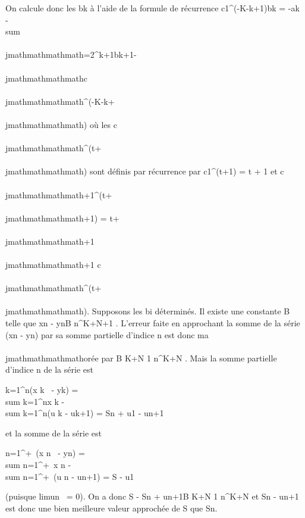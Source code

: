On calcule donc les bk à l'aide de la formule de récurrence
c1^(-K-k+1)bk = -ak
-\\sum ~
\\\\jmathmathmathmath=2^k+1bk+1-\\\\jmathmathmathmathc\\\\jmathmathmathmath^(-K-k+\\\\jmathmathmathmath) où
les c\\\\jmathmathmathmath^(t+\\\\jmathmathmathmath) sont définis par récurrence par
c1^(t+1) = t + 1 et c\\\\jmathmathmathmath+1^(t+\\\\jmathmathmathmath+1) =
t+\\\\jmathmathmathmath+1 \over \\\\jmathmathmathmath+1 c\\\\jmathmathmathmath^(t+\\\\jmathmathmathmath). Supposons
les bi déterminés. Il existe une constante B telle que
\textbar{}xn - yn\textbar{}\leq B
\over n^K+N+1 . L'erreur faite en approchant
la somme de la série \\\sum
 (xn - yn) par sa somme partielle d'indice n est
donc ma\\\\jmathmathmathmathorée par  B \over K+N  1
\over n^K+N . Mais la somme partielle
d'indice n de la série est

\sum k=1^n(x k~ -
yk) = \\sum
k=1^nx k -\\sum
k=1^n(u k - uk+1) = Sn +
u1 - un+1

et la somme de la série est

\sum n=1^+\infty~(x n~ -
yn) = \\sum
n=1^+\infty~x n -\\sum
n=1^+\infty~(u n - un+1) = S -
u1

(puisque limun~ = 0). On a donc
\textbar{}S - Sn + un+1\textbar{}\leq B
\over K+N  1 \over n^K+N
et Sn - un+1 est donc une bien meilleure valeur
approchée de S que Sn.

